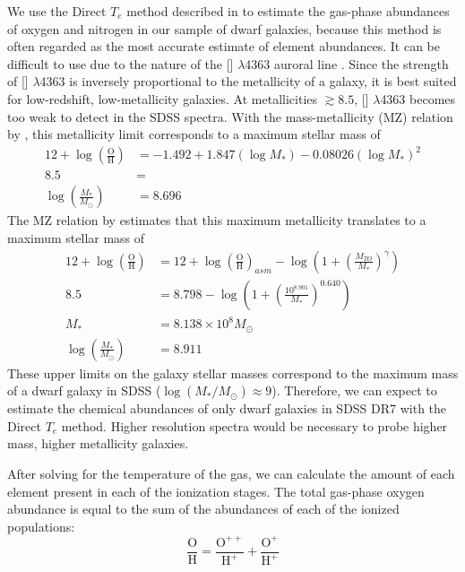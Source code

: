 We use the Direct $T_e$ method described in \cite{Izotov06} to estimate the 
gas-phase abundances of oxygen and nitrogen in our sample of dwarf galaxies, 
because this method is often regarded as the most accurate estimate of element 
abundances.  It can be difficult to use due to the nature of the [] 
$\lambda$4363 auroral line \citep[for a more detailed discussion, see][]
{Douglass17a}.  Since the strength of [] $\lambda$4363 is inversely 
proportional to the metallicity of a galaxy, it is best suited for low-redshift, 
low-metallicity galaxies.  At metallicities \OH $\gtrsim 8.5$, [] 
$\lambda$4363 becomes too weak to detect in the SDSS spectra.  With the 
mass-metallicity (MZ) relation by \cite{Tremonti04}, this metallicity limit 
corresponds to a maximum stellar mass of
\begin{align*}
    12 + \log \left( \frac{\text{O}}{\text{H}} \right) &= -1.492 + 1.847(\log M_*) - 0.08026(\log M_*)^2\\
    8.5 &= \\
    \log \left( \frac{M_*}{M_\odot} \right) &= 8.696
\end{align*}
The MZ relation by \cite{Andrews13} estimates that this maximum metallicity 
translates to a maximum stellar mass of
\begin{align*}
    12 + \log \left( \frac{\text{O}}{\text{H}} \right) &= 12 + \log \left( \frac{\text{O}}{\text{H}} \right)_{asm} - \log \left( 1 + \left( \frac{M_{TO}}{M_*} \right)^\gamma \right)\\
    8.5 &= 8.798 - \log \left( 1 + \left( \frac{10^{8.901}}{M_*} \right)^{0.640} \right)\\
    M_* &= 8.138\times 10^8 M_\odot\\
    \log \left( \frac{M_*}{M_\odot} \right) &= 8.911
\end{align*}
These upper limits on the galaxy stellar masses correspond to the maximum mass 
of a dwarf galaxy in SDSS ($\log (M_*/M_\odot) \approx 9$).  Therefore, we can 
expect to estimate the chemical abundances of only dwarf galaxies in SDSS DR7 
with the Direct $T_e$ method.  Higher resolution spectra would be necessary to 
probe higher mass, higher metallicity galaxies.

After solving for the temperature of the gas, we can 
calculate the amount of each element present in each of the ionization stages.  
The total gas-phase oxygen abundance is equal to the sum of the abundances of 
each of the ionized populations:
\begin{equation}
	\frac{\text{O}}{\text{H}} = \frac{\text{O}^{++}}{\text{H}^+} + \frac{\text{O}^+}{\text{H}^+}
\end{equation}

